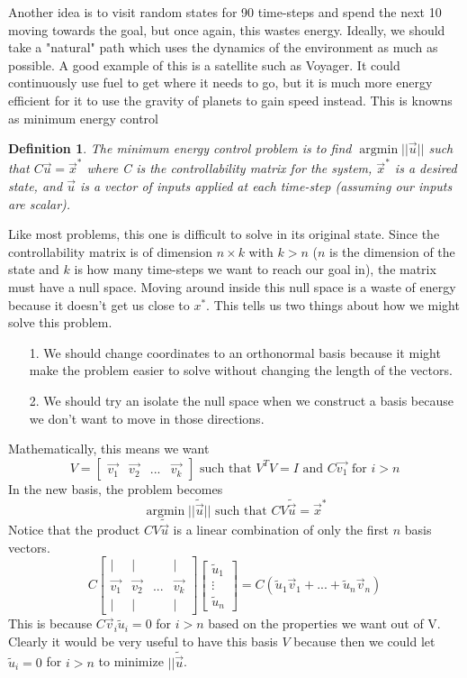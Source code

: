 \documentclass{article}
\newtheorem{definition}{Definition}
\DeclareMathOperator*{\argmin}{argmin}
\begin{document}
Another idea is to visit random states for 90 time-steps and spend the next 10 moving towards the goal, but once again, this wastes energy.
Ideally, we should take a "natural" path which uses the dynamics of the environment as much as possible.
A good example of this is a satellite such as Voyager. It could continuously use fuel to get where it needs to go, but it is much more energy efficient for it to use the gravity of planets to gain speed instead.
This is knowns as minimum energy control
\begin{definition}
    The minimum energy control problem is to find $\argmin{||\vec{u}||}$ such that $C\vec{u}=\vec{x}^*$ where 
    C is the controllability matrix for the system, $\vec{x}^*$ is a desired state, and $\vec{u}$ is a vector of inputs applied at each time-step (assuming our inputs are scalar).
\end{definition}
Like most problems, this one is difficult to solve in its original state. Since the controllability matrix is of dimension $n \times k$ with $k > n$ ($n$ is the dimension of the state and $k$ is how many time-steps we want to reach our goal in), 
the matrix must have a null space. Moving around inside this null space is a waste of energy because it doesn't get us close to $x^*$. This tells us two things about how we might solve this problem.
\begin{itemize}
    \item[1. ] We should change coordinates to an orthonormal basis because it might make the problem easier to solve without changing the length of the vectors.
    \item[2. ] We should try an isolate the null space when we construct a basis because we don't want to move in those directions.  
\end{itemize}
Mathematically, this means we want
\[
    V = \left[
        \begin{array}{cccc}
            \vec{v_1} & \vec{v_2} & ... & \vec{v_k}
        \end{array}
    \right] \text{ such that } V^TV=I \text{ and } C\vec{v_1} \text{ for } i > n
\]
In the new basis, the problem becomes
\[
    \argmin{||\tilde{\vec{u}}||} \text{ such that } CV\tilde{\vec{u}}=\vec{x}^*
\]
Notice that the product $CV\tilde{\vec{u}}$ is a linear combination of only the first $n$ basis vectors.
\[
    C \left[
        \begin{array}{cccc}
            | & | & & |\\
            \vec{v_1} & \vec{v_2} & ... & \vec{v_k}\\
            | & | & & |
        \end{array}
    \right] \left[
        \begin{array}{c}
            \tilde{u}_1\\
            \vdots\\
            \tilde{u}_n
        \end{array}
    \right] = C (\tilde{u}_1\vec{v}_1+...+\tilde{u}_n\vec{v}_n)
\]
This is because $C\vec{v}_i\tilde{u}_i=0$ for $i>n$ based on the properties we want out of V.
Clearly it would be very useful to have this basis $V$ because then we could let $\tilde{u}_i=0$ for $i > n$ to minimize $||\tilde{\vec{u}}$.
\end{document}
